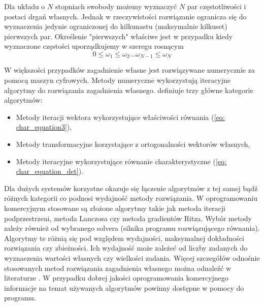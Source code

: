 Dla układu o $N$ stopniach swobody możemy wyznaczyć $N$ par częstotliwości i postaci drgań własnych. Jednak w rzeczywistości rozwiązanie ogranicza się do wyznaczenia jedynie ograniczonej do kilkunastu (maksymalnie kilkuset) pierwszych par. Określenie "pierwszych" właściwe jest w przypadku kiedy wyznaczone częstości uporządkujemy w szeregu rosnącym
\begin{equation} \label{eq: eigenvalues_list}
0 \leq \omega_1  \leq \omega_2 \dots  \omega_{N-1} \leq  \omega_N
\end{equation}

W większości przypadków zagadnienie własne jest rozwiązywane numerycznie za pomocą maszyn cyfrowych. Metody numeryczne wykorzystują iteracyjne algorytmy do rozwiązania zagadnienia własnego. \cite{Chopra2012a} definiuje trzy główne kategorie algorytmów: 
\begin{itemize}[noitemsep]
	\item Metody iteracji wektora wykorzystujące właściwości równania (\ref{eq: char_equation3}),
	\item Metody transformacyjne korzystające z ortogonalności wektorów własnych,
	\item Metody iteracyjne wykorzystujące równanie charakterystyczne (\ref{eq: char_equation_det}).
\end{itemize}
Dla dużych systemów korzystne okazuje się łączenie algorytmów z tej samej bądź różnych kategorii co podnosi wydajność metody rozwiązania. W oprogramowaniu komercyjnym stosowane są złożone algorytmy takie jak metoda iteracji podprzestrzeni, metoda Lanczosa czy metoda gradientów Ritza. Wybór metody zależy również od wybranego solvera (silnika programu rozwiązującego równania). Algorytmy te różnią się pod względem wydajności, maksymalnej dokładności rozwiązania czy zbieżności. Ich wydajność może zależeć od liczby zadanych do wyznaczenia wartości własnych czy wielkości zadania. Więcej szczegółów odnośnie stosowanych metod rozwiązania zagadnienia własnego można odnaleźć w literaturze \parencite{Bathe2006,Wilson1983,Wilson1997,Fialko2000,Papadrakakis1993,Hughes1987,Chopra2012a}. W przypadku dobrej jakości oprogramowania komercyjnego informacje na temat używanych algorytmów powinny dostępne w pomocy do programu.

